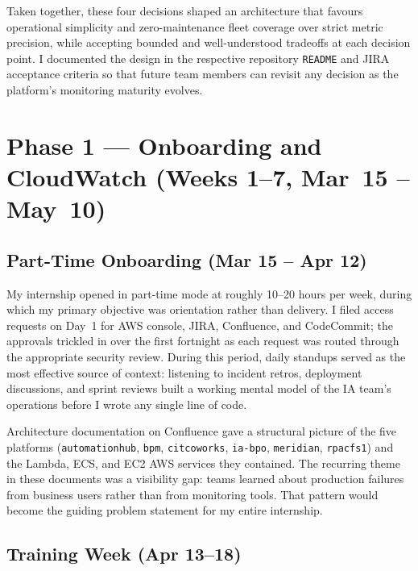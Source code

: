 Taken together, these four decisions shaped an architecture that favours
operational simplicity and zero-maintenance fleet coverage over strict
metric precision, while accepting bounded and well-understood tradeoffs
at each decision point. I documented the design in the respective
repository \texttt{README} and JIRA acceptance criteria so that future
team members can revisit any decision as the platform's monitoring
maturity evolves.



\section{Phase 1 --- Onboarding and CloudWatch (Weeks 1--7, Mar~15 -- May~10)}
\label{sec:phase1_onboarding}

\subsection{Part-Time Onboarding (Mar 15 -- Apr 12)}

My internship opened in part-time mode at roughly 10--20 hours per week, during
which my primary objective was orientation rather than delivery. I filed access requests
on Day~1 for AWS console, JIRA, Confluence, and CodeCommit; the approvals
trickled in over the first fortnight as each request was routed through the appropriate
security review. During this period, daily standups served as the most effective
source of context: listening to incident retros, deployment discussions, and sprint
reviews built a working mental model of the IA team's operations before I wrote any single
line of code.

Architecture documentation on Confluence gave a structural picture of the five
platforms (\texttt{automationhub}, \texttt{bpm}, \texttt{citcoworks},
\texttt{ia-bpo}, \texttt{meridian}, \texttt{rpacfs1}) and the Lambda, ECS, and EC2 AWS services they
contained. The recurring theme in these documents was a visibility gap: teams learned
about production failures from business users rather than from monitoring tools. That
pattern would become the guiding problem statement for my entire internship.

\subsection{Training Week (Apr 13--18)}

